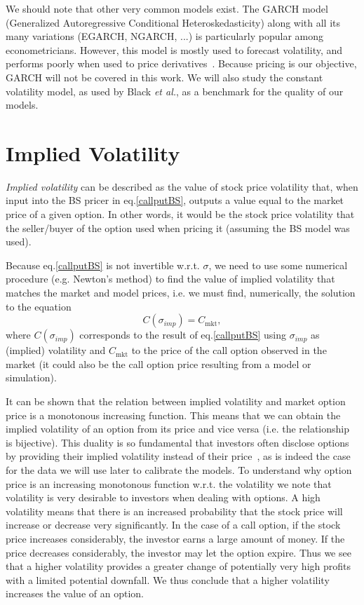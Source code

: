 We should note that other very common models exist. The GARCH model (Generalized Autoregressive Conditional Heteroskedasticity) along with all its many variations (EGARCH, NGARCH, ...) is particularly popular among econometricians. However, this model is mostly used to forecast volatility, and performs poorly when used to price derivatives~\citep{chourdakis}. Because pricing is our objective, GARCH will not be covered in this work. We will also study the constant volatility model, as used by Black \textit{et al.}, as a benchmark for the quality of our models.



\section{Implied Volatility}
\label{section:impliedvolatility}
\emph{Implied volatility} can be described as the value of stock price volatility that, when input into the BS pricer in eq.\eqref{callputBS}, outputs a value equal to the market price of a given option.
In other words, it would be the stock price volatility that the seller/buyer of the option used when pricing it (assuming the BS model was used).

Because eq.\eqref{callputBS} is not invertible w.r.t. $\sigma$, we need to use some numerical procedure (e.g. Newton's method) to find the value of implied volatility that matches the market and model prices, i.e. we must find, numerically, the solution to the equation
\begin{equation}\label{impvolform}
C(\sigma_{imp})=C_{\mathrm{mkt}},
\end{equation}
\noindent where $C(\sigma_{imp})$ corresponds to the result of eq.\eqref{callputBS} using $\sigma_{imp}$ as (implied) volatility and $C_{\mathrm{mkt}}$ to the price of the call option observed in the market (it could also be the call option price resulting from a model or simulation).


It can be shown that the relation between implied volatility and market option price is a monotonous increasing function.
This means that we can obtain the implied volatility of an option from its price and vice versa (i.e. the relationship is bijective). This duality is so fundamental that investors often disclose options by providing their implied volatility instead of their price~\citep{Wilmott}, as is indeed the case for the data we will use later to calibrate the models.
To understand why option price is an increasing monotonous function w.r.t. the volatility we note that volatility is very desirable to investors when dealing with options. A high volatility means that there is an increased probability that the stock price will increase or decrease very significantly. In the case of a call option, if the stock price increases considerably, the investor earns a large amount of money. If the price decreases considerably, the investor may let the option expire. Thus we see that a higher volatility provides a greater change of potentially very high profits with a limited potential downfall. We thus conclude that a higher volatility increases the value of an option.



